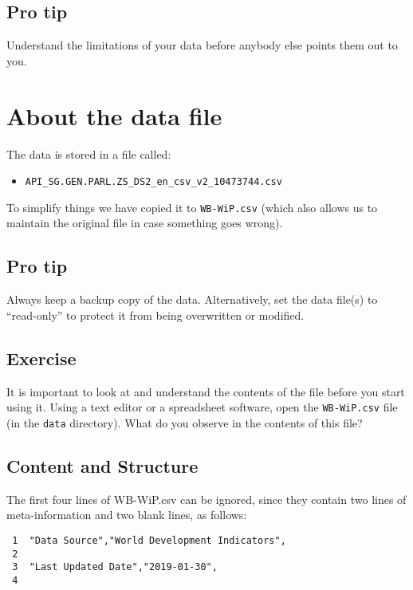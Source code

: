 \documentclass[a4paper,9pt,twocolumn,twoside,printwatermark=false]{pinp}
\providecommand{\tightlist}{%
  \setlength{\itemsep}{0pt}\setlength{\parskip}{0pt}}
\begin{document}
\subsection{Pro tip}\label{pro-tip}

Understand the limitations of your data before anybody else points them
out to you.

\section{About the data file}\label{about-the-data-file}

The data is stored in a file called:

\begin{itemize}
\tightlist
\item
  \texttt{API\_SG.GEN.PARL.ZS\_DS2\_en\_csv\_v2\_10473744.csv}
\end{itemize}

To simplify things we have copied it to \texttt{WB-WiP.csv} (which also
allows us to maintain the original file in case something goes wrong).

\subsection{Pro tip}\label{pro-tip-1}

Always keep a backup copy of the data. Alternatively, set the data
file(s) to ``read-only'' to protect it from being overwritten or
modified.

\subsection{Exercise}\label{exercise}

It is important to look at and understand the contents of the file
before you start using it. Using a text editor or a spreadsheet
software, open the \texttt{WB-WiP.csv} file (in the \texttt{data}
directory). What do you observe in the contents of this file?

\subsection{Content and Structure}\label{content-and-structure}

The first four lines of WB-WiP.csv can be ignored, since they contain
two lines of meta-information and two blank lines, as follows:

\begin{verbatim}
 1  ﻿"Data Source","World Development Indicators",
 2  
 3  "Last Updated Date","2019-01-30",
 4  
\end{verbatim}
\end{document}
